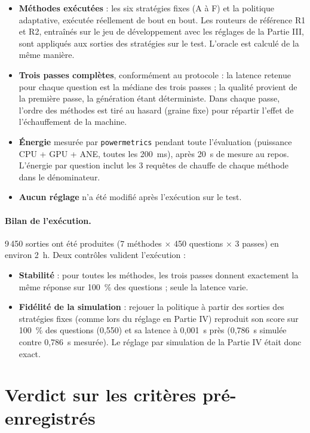 \documentclass[11pt,a4paper]{article}
\begin{document}
\begin{itemize}
\item \textbf{Méthodes exécutées} : les six stratégies fixes (A à F) et la politique adaptative,
exécutée réellement de bout en bout. Les routeurs de référence R1 et R2, entraînés sur le jeu de
développement avec les réglages de la Partie III, sont appliqués aux sorties des stratégies sur le test.
L'oracle est calculé de la même manière.
\item \textbf{Trois passes complètes}, conformément au protocole : la latence retenue pour chaque
question est la médiane des trois passes ; la qualité provient de la première passe, la génération
étant déterministe. Dans chaque passe, l'ordre des méthodes est tiré au hasard (graine fixe) pour
répartir l'effet de l'échauffement de la machine.
\item \textbf{Énergie} mesurée par \texttt{powermetrics} pendant toute l'évaluation (puissance CPU + GPU
+ ANE, toutes les 200~ms), après 20~s de mesure au repos. L'énergie par question inclut les 3 requêtes
de chauffe de chaque méthode dans le dénominateur.
\item \textbf{Aucun réglage} n'a été modifié après l'exécution sur le test.
\end{itemize}

\paragraph{Bilan de l'exécution.} 9\,450 sorties ont été produites (7 méthodes $\times$ 450 questions
$\times$ 3 passes) en environ 2~h. Deux contrôles valident l'exécution :
\begin{itemize}
\item \textbf{Stabilité} : pour toutes les méthodes, les trois passes donnent exactement la même réponse
sur 100~\% des questions ; seule la latence varie.
\item \textbf{Fidélité de la simulation} : rejouer la politique à partir des sorties des stratégies fixes
(comme lors du réglage en Partie IV) reproduit son score sur 100~\% des questions (0,550) et sa latence
à 0,001~s près (0,786~s simulée contre 0,786~s mesurée). Le réglage par simulation de la Partie IV
était donc exact.
\end{itemize}

\section{Verdict sur les critères pré-enregistrés}\label{sec:verdict}
\end{document}
